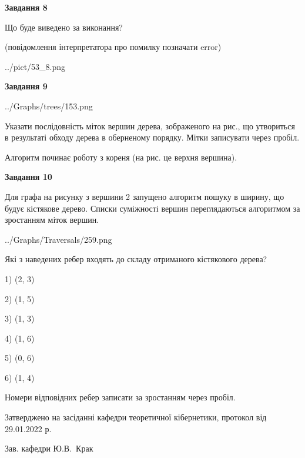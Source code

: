 \documentclass[12pt, ukrainian]{article}
\begin{document}
{\begin {large}
{\begin {center}\textbf{Завдання 8}\end {center}}\par
Що буде виведено за виконання?\par
 (повідомлення інтерпретатора про помилку позначати error)\par
\begin{center}
	{../pict/53_8.png}
\end{center}
\newpage

{\begin {center}\textbf{Завдання 9}\end {center}}\par

\begin{center}
	{../Graphs/trees/153.png}
\end{center}
Указати послідовність міток вершин дерева, зображеного на рис., що утвориться в результаті обходу дерева в оберненому порядку. Мітки записувати через пробіл.\par Алгоритм починає роботу з кореня (на рис. це верхня вершина).\par
\newpage

{\begin {center}\textbf{Завдання 10}\end {center}}\par
Для графа на рисунку з вершини 2 запущено алгоритм пошуку в ширину, що будує кістякове дерево. Списки суміжності вершин переглядаються алгоритмом за зростанням міток вершин.\par
\begin{center}
	{../Graphs/Traversals/259.png}
\end{center}
\par Які з наведених ребер входять до складу отриманого кістякового дерева?\par
1) (2, 3)\par
2) (1, 5)\par
3) (1, 3)\par
4) (1, 6)\par
5) (0, 6)\par
6) (1, 4)\par
{\vskip 15pt} Номери відповідних ребер записати за зростанням через пробіл.\par
\newpage


\end {large}
}
{\smallskip \begin {small} Затверджено на засіданні кафедри теоретичної кібернетики, протокол  від   29.01.2022 р.\par\smallskip\smallskip
{\parbox {6.5 cm}{Зав. кафедри \dotfill Ю.В.~Крак}} \end{small}}
\end{document}
